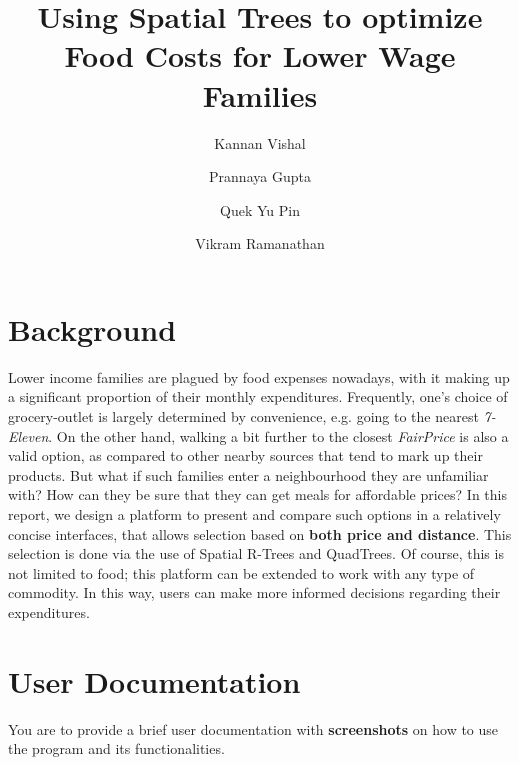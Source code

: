 \documentclass[12pt]{article}
\begin{document}
\pagestyle{fancy}
\fancyhf{}



{\selectfont
\title{
	\huge \textbf{Using Spatial Trees to optimize Food Costs for Lower Wage Families}
}

\date{}

\author[1]{Kannan Vishal}
\author[1]{Prannaya Gupta}
\author[1]{Quek Yu Pin}
\author[1]{Vikram Ramanathan}

\maketitle

\vspace{-2cm}

\tableofcontents

\thispagestyle{empty}
\newpage

\section{Background}

Lower income families are plagued by food expenses nowadays, with it making up a significant proportion of their monthly expenditures. Frequently, one's choice of grocery-outlet is largely determined by convenience, e.g. going to the nearest \textit{7-Eleven}. On the other hand, walking a bit further to the closest \textit{FairPrice} is also a valid option, as compared to other nearby sources that tend to mark up their products. But what if such families enter a neighbourhood they are unfamiliar with? How can they be sure that they can get meals for affordable prices? In this report, we design a platform to present and compare such options in a relatively concise interfaces, that allows selection based on \textbf{both price and distance}. This selection is done via the use of Spatial R-Trees and QuadTrees. Of course, this is not limited to food; this platform can be extended to work with any type of commodity. In this way, users can make more informed decisions regarding their expenditures.
    
   
\section{User Documentation}
You are to provide a brief user documentation with \textbf{screenshots} on how to use the
program and its functionalities.

}
\end{document}
